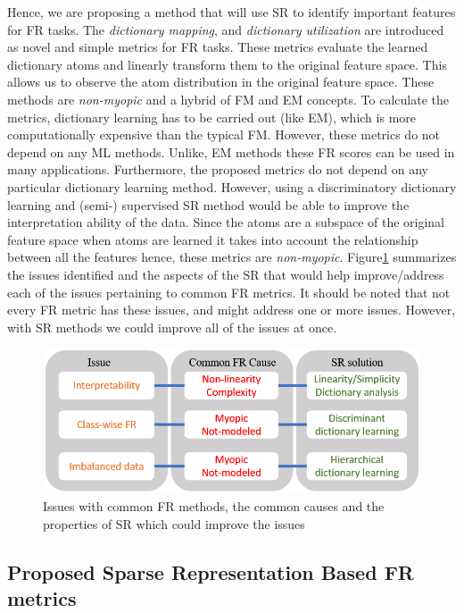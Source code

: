 Hence, we are proposing a method that will use SR to identify important features for FR tasks. The \textit{dictionary mapping}, and \textit{dictionary utilization} are introduced as novel and simple metrics for FR tasks. These metrics evaluate the learned dictionary atoms and linearly transform them to the original feature space. This allows us to observe the atom distribution in the original feature space. These methods are \textit{non-myopic} and a hybrid of FM and EM concepts. To calculate the metrics, dictionary learning has to be carried out (like EM), which is more computationally expensive than the typical FM\@. However, these metrics do not depend on any ML methods. Unlike, EM methods these FR scores can be used in many applications. Furthermore, the proposed metrics do not depend on any particular dictionary learning method. However, using a discriminatory dictionary learning and (semi-) supervised SR method would be able to improve the interpretation ability of the data. Since the atoms are a subspace of the original feature space when atoms are learned it takes into account the relationship between all the features hence, these metrics are \textit{non-myopic}. Figure\ref{fig: SR_sol} summarizes the issues identified and the aspects of the SR that would help improve/address each of the issues pertaining to common FR metrics. It should be noted that not every FR metric has these issues, and might address one or more issues. However, with SR methods we could improve all of the issues at once.

\begin{figure}[!t]
    \centering
    \includegraphics[width=12cm]{figures/eng694/SR_sol.png}
    \caption{Issues with common FR methods, the common causes and the properties of SR which could improve the issues}\label{fig: SR_sol}
\end{figure}

\subsection{Proposed Sparse Representation Based FR metrics}

